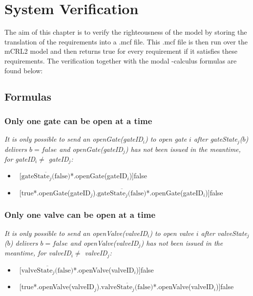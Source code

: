 \section{System Verification}
The aim of this chapter is to verify the righteousness of the model by storing the translation of the requirements into a .mcf file. This .mcf file is then run over the mCRL2 model and then returns true for every requirement if it satisfies these requirements. The verification together with the modal {\textmu}-calculus formulas are found below:
\subsection{Formulas}
\subsubsection{Only one gate can be open at a time}
\textit{It is only possible to send an openGate(gateID$_i$) to open gate $i$ after gateState$_j$($ b $) delivers $b = false$ and openGate(gateID$_j$) has not been issued in the meantime, for gateID$_i \neq$ gateID$_j$:}
	\begin{itemize}
		\item ~[$\overline{\textrm{gateState$_j$(false)}}$*.openGate(gateID$_i$)]false
		\item ~[true*.openGate(gateID$_j$).$\overline{\textrm{gateState$_j$(false)}}$*.openGate(gateID$_i$)]false
	\end{itemize}	
	
\subsubsection{Only one valve can be open at a time}
\textit{It is only possible to send an openValve(valveID$_i$) to open valve $i$ after \linebreak valveState$_j$($ b $) delivers $b = false$ and openValve(valveID$_j$) has not been issued in the meantime, for valveID$_i \neq$ valveID$_j$:}
	\begin{itemize}
		\item ~[$\overline{\textrm{valveState$_j$(false)}}$*.openValve(valveID$_i$)]false
		\item ~[true*.openValve(valveID$_j$).$\overline{\textrm{valveState$_j$(false)}}$*.openValve(valveID$_i$)]false
	\end{itemize}
	
